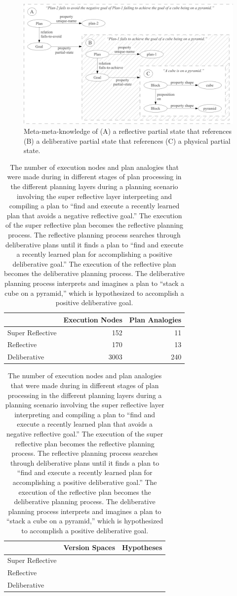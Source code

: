 \begin{figure}
\centering
\includegraphics[width=12cm]{gfx/meta_meta_knowledge}
\caption{Meta-meta-knowledge of (A) a reflective partial state that
  references (B) a deliberative partial state that references (C) a
  physical partial state.}
\label{figure:meta_meta_knowledge}
\end{figure}



\begin{table}
\centering
\begin{tabular}{|l|r|r|}
\hline
                 &Execution Nodes &Plan Analogies \\
\hline
Super Reflective & 152            & 11            \\
\hline
Reflective       & 170            & 13            \\
\hline
Deliberative     & 3003           & 240           \\
\hline
\end{tabular}

\begin{tabular}{|l|r|r|}
\hline
                 &Version Spaces &Hypotheses \\
\hline
Super Reflective &               &           \\
\hline
Reflective       &               &           \\
\hline
Deliberative     &               &           \\
\hline
\end{tabular}
\caption{The number of execution nodes and plan analogies that were
  made during in different stages of plan processing in the different
  planning layers during a planning scenario involving the super
  reflective layer interpreting and compiling a plan to ``find and
  execute a recently learned plan that avoids a negative reflective
  goal.''  The execution of the super reflective plan becomes the
  reflective planning process.  The reflective planning process
  searches through deliberative plans until it finds a plan to ``find
  and execute a recently learned plan for accomplishing a positive
  deliberative goal.''  The execution of the reflective plan becomes
  the deliberative planning process.  The deliberative planning
  process interprets and imagines a plan to ``stack a cube on a
  pyramid,'' which is hypothesized to accomplish a positive
  deliberative goal.}
\label{table:plan_interpretation_computational_complexity_of_layers}
\end{table}

